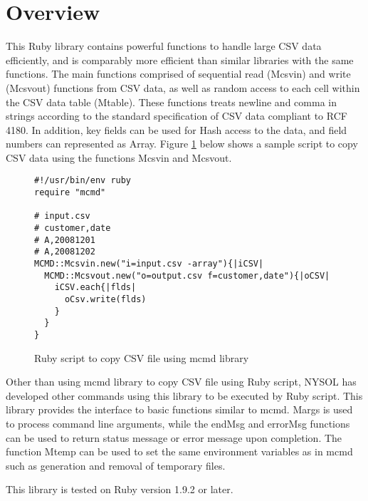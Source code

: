 
\section{Overview}
This Ruby library contains powerful functions to handle large CSV data efficiently, and is comparably more efficient than similar libraries with the same functions. 
The main functions comprised of sequential read (Mcsvin) and write (Mcsvout) functions from CSV data, as well as random access to each cell within the CSV data table (Mtable). These functions treats newline and comma in strings according to the standard specification of CSV data compliant to RCF 4180. In addition, key fields can be used for Hash access to the data, and field numbers can represented as Array. 
Figure \ref{fig:mcmdRB_cp} below shows a sample script to copy CSV data using the functions Mcsvin and Mcsvout. 

\begin{figure}[!hbt]

\begin{Verbatim}[baselinestretch=0.7,frame=single]
#!/usr/bin/env ruby
require "mcmd"

# input.csv
# customer,date
# A,20081201
# A,20081202
MCMD::Mcsvin.new("i=input.csv -array"){|iCSV|
  MCMD::Mcsvout.new("o=output.csv f=customer,date"){|oCSV|
    iCSV.each{|flds|
      oCsv.write(flds)
    }
  }
}
\end{Verbatim}
\caption{Ruby script to copy CSV file using mcmd library \label{fig:mcmdRB_cp}}
\end{figure}

Other than using mcmd library to copy CSV file using Ruby script, NYSOL has developed other commands using this library to be executed by Ruby script. 
This library provides the interface to basic functions similar to mcmd. Margs is used to process command line arguments, while the endMsg and errorMsg functions can be used to return status message or error message upon completion. 
The function Mtemp can be used to set the same environment variables as in mcmd such as generation and removal of temporary files. 


This library is tested on Ruby version 1.9.2 or later.  


